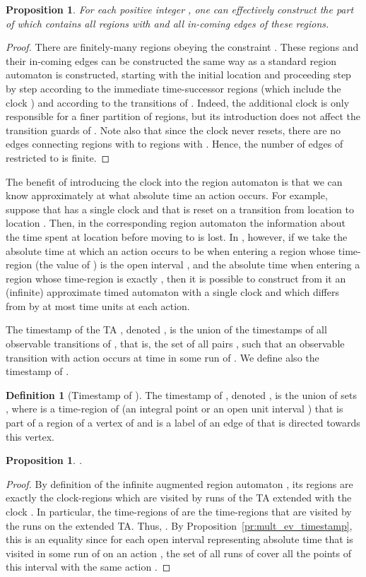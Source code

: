 \documentclass[11pt]{amsart}
\newtheorem{proposition}[theorem]{Proposition}
\theoremstyle{definition}
\newtheorem{definition}[theorem]{Definition}
\begin{document}
\begin{proposition}
	\label{prop:finite_IARA}
	For each positive integer , one can effectively construct the part of  which contains all regions with  and all in-coming edges of these regions. 
\end{proposition}
\begin{proof}
	There are finitely-many regions obeying the constraint .
	These regions and their in-coming edges can be constructed the same way as a standard region automaton is constructed, starting with the initial location and proceeding step by step according to the immediate time-successor regions (which include the clock ) and according to the transitions of .
	Indeed, the additional clock  is only responsible for a finer partition of regions, but its introduction does not affect the transition guards of .  
	Note also that since the clock  never resets, there are no edges connecting regions with  to regions with .
	Hence, the number of edges of  restricted to  is finite.   
\end{proof}

The benefit of introducing the clock  into the region automaton is that we can know approximately at what absolute time an action occurs. 
For example, suppose that  has a single clock  and that  is reset on a transition from location  to location .
Then, in the corresponding region automaton the information about the time spent at location  before moving to  is lost.
In , however, if we take the absolute time at which an action occurs to be  when entering a region whose time-region (the value of ) is the open interval , and the absolute time  when entering a region whose time-region is exactly , then it is possible to construct from it an (infinite) approximate timed automaton with a single clock and which differs from  by at most  time units at each action.

The timestamp of the TA , denoted , is the union of the timestamps of all observable transitions of , that is, the set of all pairs , such that an observable transition with action  occurs at time  in some run of .
We define also the timestamp of .
\begin{definition}[Timestamp of ]
	The timestamp of , denoted , is the union of sets , where  is a time-region of  (an integral point  or an open unit interval ) that is part of a region of a vertex of  and  is a label of an edge of  that is directed towards this vertex.
\end{definition}

\begin{proposition}
	\label{prop:eq_timestamp}
	.
\end{proposition}
\begin{proof}
	By definition of the infinite augmented region automaton , its regions are exactly the clock-regions which are visited by runs of the TA  extended with the clock .
	In particular, the time-regions of  are the time-regions that are visited by the runs on the extended TA.
	Thus, .
	By Proposition~\ref{pr:mult_ev_timestamp}, this is an equality since for each open interval  representing absolute time that is visited in some run of  on an action , the set of all runs of  cover all the points of this interval with the same action .
\end{proof}
\end{document}
